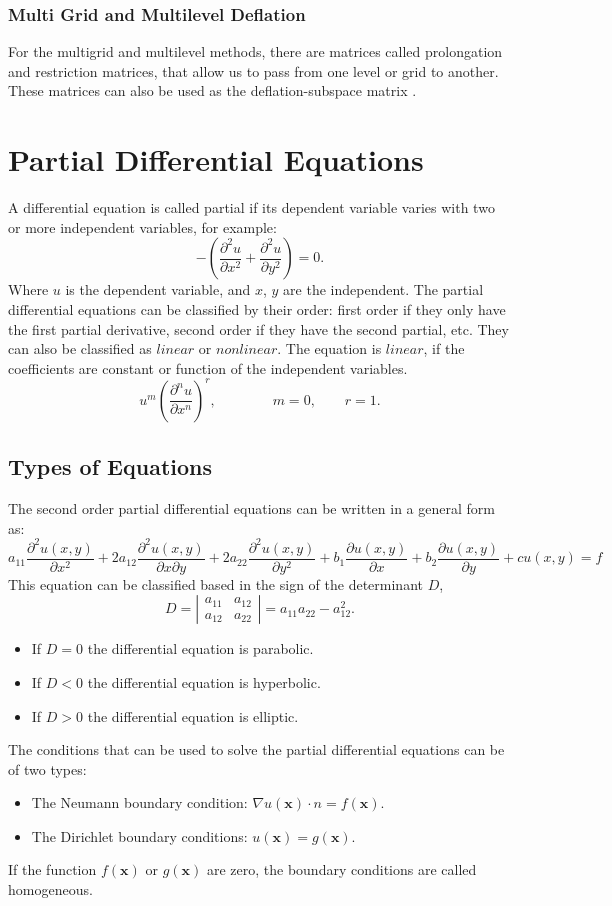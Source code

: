 \documentclass[a4paper,10pt]{report}
\begin{document}
\subsection{Multi Grid and Multilevel Deflation}
For the multigrid and multilevel methods, there are matrices called prolongation and restriction matrices, that
allow us to pass from one level or grid to another. These matrices can also be used as the deflation-subspace matrix \cite{Smith96}.
\chapter{Partial Differential Equations}
A differential equation is called partial if its dependent variable varies with two or more independent variables,
for example:
\begin{equation*}
 -\left( \frac{\partial^2 u}{\partial x^2}+\frac{\partial^2 u}{\partial y^2}\right) =0.
\end{equation*}
Where $u$ is the dependent variable, and $x$, $y$ are the independent. The partial differential equations can be classified by
their order: first order if they only have the first partial derivative, second order if they have the second partial, etc. They can also be
classified as $linear$ or $nonlinear$. The equation is $linear$, if the coefficients are constant or function of the independent variables.
$$u^m\left( \frac{\partial^n u}{\partial x^n}\right)^r,\qquad \qquad m=0, \qquad r=1.$$
\section{Types of Equations}
The second order partial differential equations can be written in a general form as:
\begin{equation*}
 a_{11}\frac{\partial^2 u(x,y)}{\partial x^2}+2a_{12}\frac{\partial^2 u(x,y)}{\partial x \partial y}+2a_{22}\frac{\partial^2 u(x,y)}{\partial y^2}
 +b_1\frac{\partial u(x,y)}{\partial x}+b_2\frac{\partial u(x,y)}{\partial y}+cu(x,y)=f
\end{equation*}
This equation can be classified based in the sign of the determinant $D$,
$$D= \left|\begin{array}{cc}
a_{11} & a_{12}\\
a_{12} & a_{22}
\end{array}\right|=a_{11}a_{22}-a^2_{12}.$$
\begin{itemize}
 \item If $D=0$ the differential equation is parabolic.
 \item If $D<0$ the differential equation is hyperbolic.
 \item If $D>0$ the differential equation is elliptic.
\end{itemize}
The conditions that can be used to solve the partial differential equations can be of two types:
\begin{itemize}
\item {The Neumann} boundary condition: $\nabla u(\mathbf{x})\cdot n=f(\mathbf{x})$.
\item {The Dirichlet} boundary conditions: $u(\mathbf{x})=g(\mathbf{x})$.
\end{itemize}
If the function $f(\mathbf{x})$ or $g(\mathbf{x})$ are zero, the boundary conditions are called homogeneous.
\end{document}
